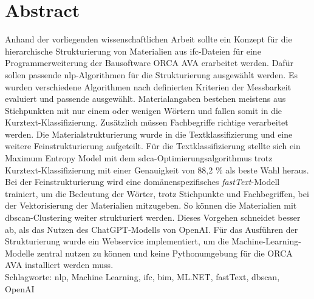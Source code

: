 \chapter*{Abstract}
Anhand der vorliegenden wissenschaftlichen Arbeit sollte ein Konzept für die hierarchische Strukturierung von Materialien aus \acf{ifc}-Dateien für eine Programmerweiterung der Bausoftware ORCA AVA erarbeitet werden. Dafür sollen passende \acf{nlp}-Algorithmen für die Strukturierung ausgewählt werden. Es wurden verschiedene Algorithmen nach definierten Kriterien der Messbarkeit evaluiert und passende ausgewählt. Materialangaben bestehen meistens aus Stichpunkten mit nur einem oder wenigen Wörtern und fallen somit in die Kurztext-Klassifizierung. Zusätzlich müssen Fachbegriffe richtige verarbeitet werden. Die Materialstrukturierung wurde in die Textklassifizierung und eine weitere Feinstrukturierung aufgeteilt. Für die Textklassifizierung stellte sich ein Maximum Entropy Model mit dem \ac{sdca}-Optimierungsalgorithmus trotz Kurztext-Klassifizierung mit einer Genauigkeit von 88,2 \% als beste Wahl heraus. Bei der Feinstrukturierung wird eine domänenspezifisches \textit{fastText}-Modell trainiert, um die Bedeutung der Wörter, trotz Stichpunkte und Fachbegriffen, bei der Vektorisierung der Materialien mitzugeben. So können die Materialien mit \acf{dbscan}-Clustering weiter strukturiert werden. Dieses Vorgehen schneidet besser ab, als das Nutzen des ChatGPT-Modells von OpenAI. Für das Ausführen der Strukturierung wurde ein Webservice implementiert, um die Machine-Learning-Modelle zentral nutzen zu können und keine Pythonumgebung für die ORCA AVA installiert werden muss.\\

\noindent Schlagworte: \acs{nlp}, Machine Learning, \acs{ifc}, \acs{bim}, ML.NET, fastText, \acs{dbscan}, OpenAI

